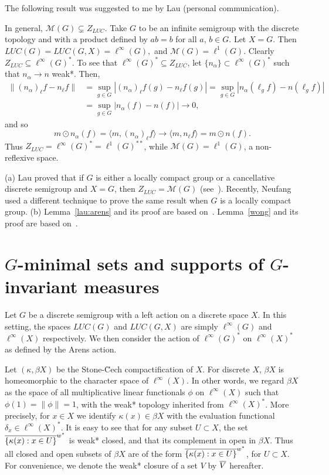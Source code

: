 The following result was suggested to me by Lau (personal communication).
\begin{example}
In general, $\mathcal{M}(G) \subsetneq Z_{LUC}$.  Take $G$ to be an infinite semigroup with the discrete
topology and with a product defined by $ab = b$ for all $a$, $b\in G$.  Let $X=G$.
Then $LUC(G) = LUC(G,X) =\ell^\infty (G),$ and $\mathcal{M}(G) = \ell^1(G)$.
Clearly $Z_{LUC}\subseteq \ell^\infty(G)^*$.  To see that $\ell^\infty(G)^* \subseteq Z_{LUC}$,
let $\{n_\alpha\}\subset\ell^\infty(G)^*$ such that $n_\alpha \rightarrow n$ weak*.
Then,
\begin{align*}
\|(n_\alpha)_\ell f - n_\ell f\| &= \sup_{g\in G} |(n_\alpha)_\ell f(g) - n_\ell f(g)|
= \sup_{g\in G} |n_\alpha (\ell_g f) - n(\ell_g f)| \\
&= \sup_{g\in G} |n_\alpha (f) - n(f)| \rightarrow 0,
\end{align*}
and so
\[
m\odot n_\alpha (f) = \langle m, (n_\alpha)_\ell f\rangle \rightarrow \langle m, n_\ell f\rangle
= m\odot n (f).
\]
Thus $Z_{LUC}=\ell^\infty (G)^* = \ell^1(G)^{**}$, while $\mathcal{M}(G) = \ell^1(G)$, a non-reflexive space.
\end{example}

\begin{remark}
(a) Lau
proved that if $G$ is either a locally compact group or a cancellative discrete semigroup
and $X=G$, then $Z_{LUC} = \mathcal{M}(G)$ (see~\cite[Theorem 1]{lau:arens}).
Recently, Neufang~\cite{neufang} used a different technique to prove the same result when $G$ is a locally compact
group.
(b) Lemma~\ref{lau:arens} and its proof are based
on~\cite[Lemma 2]{lau:arens}.  Lemma~\ref{wong} and its proof are based on~\cite[Lemma 3.1]{wong:arens}.
\end{remark}

\section{$G$-minimal sets and supports of $G$-invariant measures}\label{main:fairchild}

Let $G$ be a discrete semigroup with a left action on a discrete space $X$.
In this setting, the spaces $LUC(G)$ and $LUC(G,X)$ are simply $\ell^\infty (G)$
and $\ell^\infty (X)$ respectively.  We then consider the action of
$\ell^\infty (G)^*$ on $\ell^\infty (X)^*$ as defined by the Arens action.

Let $(\kappa,\beta X)$ be the Stone-\u{C}ech compactification of $X$.
For discrete $X$, $\beta X$ is homeomorphic to the character space of $\ell^\infty(X)$.  In other words,
we regard $\beta X$ as the space of all multiplicative
linear functionals $\phi$ on $\ell^\infty(X)$ such that $\phi(1) = \|\phi\| = 1$, with the weak* topology
inherited from $\ell^\infty(X)^*$.  More precisely, for $x\in X$ we identify $\kappa(x)\in\beta X$ with
the evaluation functional $\delta_x \in \ell^\infty(X)^*$.  It is easy to see that for any subset $U\subset X$,
the set $\overline{\{\kappa(x): x \in U\}}^{w^*}$ is weak* closed, and that its complement in open in $\beta X$.
Thus all closed and open subsets of $\beta X$ are of the form $\overline{\{\kappa(x): x\in U\}}^{w^*}$,
for $U\subset X$.  For convenience, we denote the weak* closure of a set $V$ by $\overline{V}$ hereafter.

